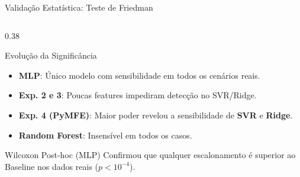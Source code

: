 \documentclass[aspectratio=169, 10pt]{beamer}
\begin{document}
\begin{frame}{Validação Estatística: Teste de Friedman}
\begin{columns}[T]
    \begin{column}{0.38\textwidth}
      \begin{block}{Evolução da Significância}
        \scriptsize
        \begin{itemize}
          \item \textbf{MLP}: Único modelo com sensibilidade em todos os cenários reais.
          \item \textbf{Exp. 2 e 3}: Poucas features impediram detecção no SVR/Ridge.
          \item \textbf{Exp. 4 (PyMFE)}: Maior poder revelou a sensibilidade de \textbf{SVR} e \textbf{Ridge}.
          \item \textbf{Random Forest}: Insensível em todos os casos.
        \end{itemize}
      \end{block}
      \begin{block}{Wilcoxon Post-hoc (MLP)}
        \scriptsize
        Confirmou que qualquer escalonamento é superior ao Baseline nos dados reais ($p < 10^{-4}$).
      \end{block}
    \end{column}
  \end{columns}
\end{frame}
\end{document}
